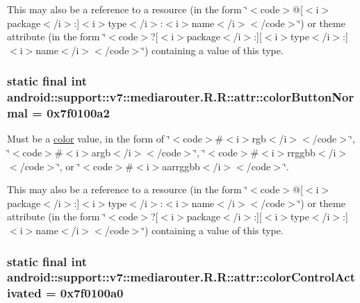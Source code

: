 This may also be a reference to a resource (in the form \char`\"{}$<$code$>$@\mbox{[}$<$i$>$package$<$/i$>$:\mbox{]}$<$i$>$type$<$/i$>$:$<$i$>$name$<$/i$>$$<$/code$>$\char`\"{}) or theme attribute (in the form \char`\"{}$<$code$>$?\mbox{[}$<$i$>$package$<$/i$>$:\mbox{]}\mbox{[}$<$i$>$type$<$/i$>$:\mbox{]}$<$i$>$name$<$/i$>$$<$/code$>$\char`\"{}) containing a value of this type. \hypertarget{classandroid_1_1support_1_1v7_1_1mediarouter_1_1_r_1_1attr_09f27eb58acb05d0acc18db8a7c8746b}{
\subsubsection[{colorButtonNormal}]{\setlength{\rightskip}{0pt plus 5cm}static final int android::support::v7::mediarouter.R.R::attr::colorButtonNormal = 0x7f0100a2}}
\label{classandroid_1_1support_1_1v7_1_1mediarouter_1_1_r_1_1attr_09f27eb58acb05d0acc18db8a7c8746b}


Must be a \hyperlink{classandroid_1_1support_1_1v7_1_1mediarouter_1_1_r_1_1color}{color} value, in the form of \char`\"{}$<$code$>$\#$<$i$>$rgb$<$/i$>$$<$/code$>$\char`\"{}, \char`\"{}$<$code$>$\#$<$i$>$argb$<$/i$>$$<$/code$>$\char`\"{}, \char`\"{}$<$code$>$\#$<$i$>$rrggbb$<$/i$>$$<$/code$>$\char`\"{}, or \char`\"{}$<$code$>$\#$<$i$>$aarrggbb$<$/i$>$$<$/code$>$\char`\"{}. 

This may also be a reference to a resource (in the form \char`\"{}$<$code$>$@\mbox{[}$<$i$>$package$<$/i$>$:\mbox{]}$<$i$>$type$<$/i$>$:$<$i$>$name$<$/i$>$$<$/code$>$\char`\"{}) or theme attribute (in the form \char`\"{}$<$code$>$?\mbox{[}$<$i$>$package$<$/i$>$:\mbox{]}\mbox{[}$<$i$>$type$<$/i$>$:\mbox{]}$<$i$>$name$<$/i$>$$<$/code$>$\char`\"{}) containing a value of this type. \hypertarget{classandroid_1_1support_1_1v7_1_1mediarouter_1_1_r_1_1attr_a103aec5a10d553f6ef21ca70906a05c}{
\subsubsection[{colorControlActivated}]{\setlength{\rightskip}{0pt plus 5cm}static final int android::support::v7::mediarouter.R.R::attr::colorControlActivated = 0x7f0100a0}}
\label{classandroid_1_1support_1_1v7_1_1mediarouter_1_1_r_1_1attr_a103aec5a10d553f6ef21ca70906a05c}


